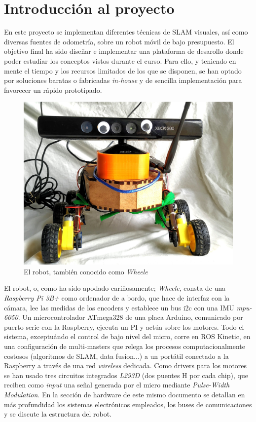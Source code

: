 \documentclass[a4paper,twoside]{article}
\begin{document}
\section{Introducción al proyecto}
En este proyecto se implementan diferentes técnicas de SLAM visuales, así como diversas fuentes de odometría, sobre un robot móvil de bajo presupuesto. El objetivo final ha sido diseñar e implementar una plataforma de desarollo donde poder estudiar los conceptos vistos durante el curso. Para ello, y teniendo en mente el tiempo y los recursos limitados de los que se disponen, se han optado por soluciones baratas o fabricadas \textit{in-house} y de sencilla implementación para favorecer un rápido prototipado. \par
\begin{figure}[h!]
	\centering
	\includegraphics[width=.6\textwidth]{images/wheele_real}
	\caption{El robot, también conocido como \textit{Wheele}}
\end{figure}
El robot, o, como ha sido apodado cariñosamente; \textit{Wheele}, consta de una \textit{Raspberry Pi 3B+} como ordenador de a bordo, que hace de interfaz con la cámara, lee las medidas de los encoders y establece un bus i2c con una IMU \textit{mpu-6050}. Un microcontrolador ATmega328 de una placa Arduino, comunicado por puerto serie con la Raspberry, ejecuta un PI y actúa sobre los motores. Todo el sistema, exceptuándo el control de bajo nivel del micro, corre en ROS Kinetic, en una configuración de multi-masters que relega los procesos computacionalmente costosos (algoritmos de SLAM, data fusion...) a un portátil conectado a la Raspberry a través de una red \textit{wireless} dedicada. Como drivers para los motores se han usado tres circuitos integrados \textit{L293D} (dos puentes H por cada chip), que reciben como \textit{input} una señal generada por el micro mediante \textit{Pulse-Width Modulation}. En la sección de hardware de este mismo documento se detallan en más profundidad los sistemas electrónicos empleados, los buses de comunicaciones y se discute la estructura del robot.\par
\end{document}
